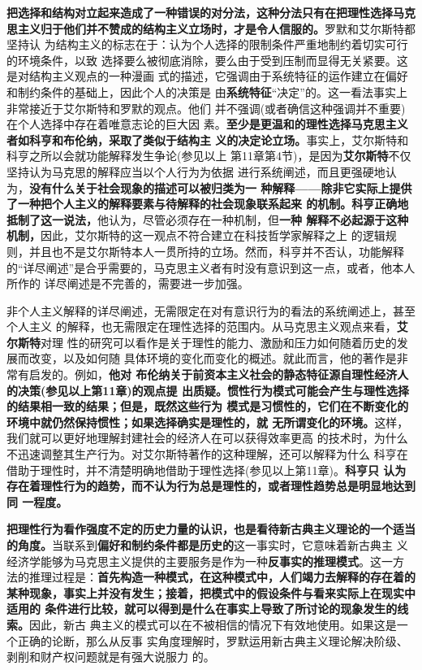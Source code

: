 \textbf{把选择和结构对立起来造成了一种错误的对分法，这种分法只有在把理性选择马克
  思主义归于他们并不赞成的结构主义立场时，才是令人信服的。}罗默和艾尔斯特都坚持认
为结构主义的标志在于：认为个人选择的限制条件严重地制约着切实可行的环境条件，以致
选择要么被彻底消除，要么由于受到压制而显得无关紧要。这是对结构主义观点的一种漫画
式的描述，它强调由于系统特征的运作建立在偏好和制约条件的基础上，因此个人的决策是
由\textbf{系统特征}“决定”的。这一看法事实上非常接近于艾尔斯特和罗默的观点。他们
并不强调(或者确信这种强调并不重要)在个人选择中存在着唯意志论的巨大因
素。\textbf{至少是更温和的理性选择马克思主义者如科亨和布伦纳，采取了类似于结构主
  义的决定论立场。}事实上，艾尔斯特和科亨之所以会就功能解释发生争论(参见以上
第11章第4节)，是因为\textbf{艾尔斯特}不仅坚持认为马克思的解释应当以个人行为为依据
进行系统阐述，而且更强硬地认为，\textbf{没有什么关于社会现象的描述可以被归类为一
  种解释——除非它实际上提供了一种把个人主义的解释要素与待解释的社会现象联系起来
  的机制。科亨正确地抵制了这一说法，}他认为，尽管必须存在一种机制，但\textbf{一种
  解释不必起源于这种机制，}因此，艾尔斯特的这一观点不符合建立在科技哲学家解释之上
的逻辑规则，并且也不是艾尔斯特本人一贯所持的立场。然而，科亨并不否认，功能解释
的“详尽阐述”是合乎需要的，马克思主义者有时没有意识到这一点，或者，他本人所作的
详尽阐述是不完善的，需要进一步加强。

非个人主义解释的详尽阐述，无需限定在对有意识行为的看法的系统阐述上，甚至个人主义
的解释，也无需限定在理性选择的范围内。从马克思主义观点来看，\textbf{艾尔斯特}对理
性的研究可以看作是关于理性的能力、激励和压力如何随着历史的发展而改变，以及如何随
具体环境的变化而变化的概述。就此而言，他的著作是非常有启发的。例如，\textbf{他对
  布伦纳关于前资本主义社会的静态特征源自理性经济人的决策(参见以上第11章)的观点提
  出质疑。惯性行为模式可能会产生与理性选择的结果相一致的结果；但是，既然这些行为
  模式是习惯性的，它们在不断变化的环境中就仍然保持惯性；如果选择确实是理性的，就
  无所谓变化的环境。}这样，我们就可以更好地理解封建社会的经济人在可以获得效率更高
的技术时，为什么不迅速调整其生产行为。对艾尔斯特著作的这种理解，还可以解释为什么
科亨在借助于理性时，并不清楚明确地借助于理性选择(参见以上第11章)。\textbf{科亨只
  认为存在着理性行为的趋势，而不认为行为总是理性的，或者理性趋势总是明显地达到同
  一程度。}

\textbf{把理性行为看作强度不定的历史力量的认识，也是看待新古典主义理论的一个适当
  的角度。}当联系到\textbf{偏好和制约条件都是历史的}这一事实时，它意味着新古典主
义经济学能够为马克思主义提供的主要服务是作为一种\textbf{反事实的推理模式}。这一方
法的推理过程是：\textbf{首先构造一种模式，在这种模式中，人们竭力去解释的存在着的
  某种现象，事实上并没有发生；接着，把模式中的假设条件与看来实际上在现实中适用的
  条件进行比较，就可以得到是什么在事实上导致了所讨论的现象发生的线索。}因此，新古
典主义的模式可以在不被相信的情况下有效地使用。如果这是一个正确的论断，那么从反事
实角度理解时，罗默运用新古典主义理论解决阶级、剥削和财产权问题就是有强大说服力
的。

